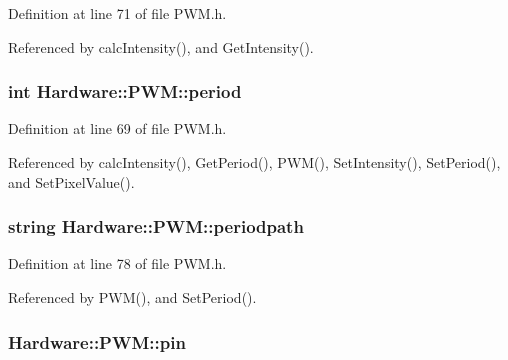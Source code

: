 Definition at line 71 of file P\+W\+M.\+h.



Referenced by calc\+Intensity(), and Get\+Intensity().

\hypertarget{class_hardware_1_1_p_w_m_a91323a511e37d396f46d08f4159ef761}{}
\subsubsection[{period}]{\setlength{\rightskip}{0pt plus 5cm}int Hardware\+::\+P\+W\+M\+::period\hspace{0.3cm}{\ttfamily [private]}}\label{class_hardware_1_1_p_w_m_a91323a511e37d396f46d08f4159ef761}


Definition at line 69 of file P\+W\+M.\+h.



Referenced by calc\+Intensity(), Get\+Period(), P\+W\+M(), Set\+Intensity(), Set\+Period(), and Set\+Pixel\+Value().

\hypertarget{class_hardware_1_1_p_w_m_a27e17a6c2e9720c571d5939f1a9ffb12}{}
\subsubsection[{periodpath}]{\setlength{\rightskip}{0pt plus 5cm}string Hardware\+::\+P\+W\+M\+::periodpath\hspace{0.3cm}{\ttfamily [private]}}\label{class_hardware_1_1_p_w_m_a27e17a6c2e9720c571d5939f1a9ffb12}


Definition at line 78 of file P\+W\+M.\+h.



Referenced by P\+W\+M(), and Set\+Period().

\hypertarget{class_hardware_1_1_p_w_m_a47a155962c7c376bf1fe27c15c1e1e1d}{}
\subsubsection[{pin}]{ Hardware\+::\+P\+W\+M\+::pin}\label{class_hardware_1_1_p_w_m_a47a155962c7c376bf1fe27c15c1e1e1d}


